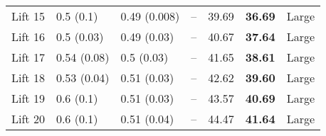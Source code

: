 \begin{tabular}{lllllll}
 Lift 15 &         0.5 (0.1) &       0.49 (0.008) &          -- &                   39.69 &           \textbf{36.69} &       Large \\
 Lift 16 &        0.5 (0.03) &        0.49 (0.03) &          -- &                   40.67 &           \textbf{37.64} &       Large \\
 Lift 17 &       0.54 (0.08) &         0.5 (0.03) &          -- &                   41.65 &           \textbf{38.61} &       Large \\
 Lift 18 &       0.53 (0.04) &        0.51 (0.03) &          -- &                   42.62 &           \textbf{39.60} &       Large \\
 Lift 19 &         0.6 (0.1) &        0.51 (0.03) &          -- &                   43.57 &           \textbf{40.69} &       Large \\
 Lift 20 &         0.6 (0.1) &        0.51 (0.04) &          -- &                   44.47 &           \textbf{41.64} &       Large \\
\bottomrule
\end{tabular}
